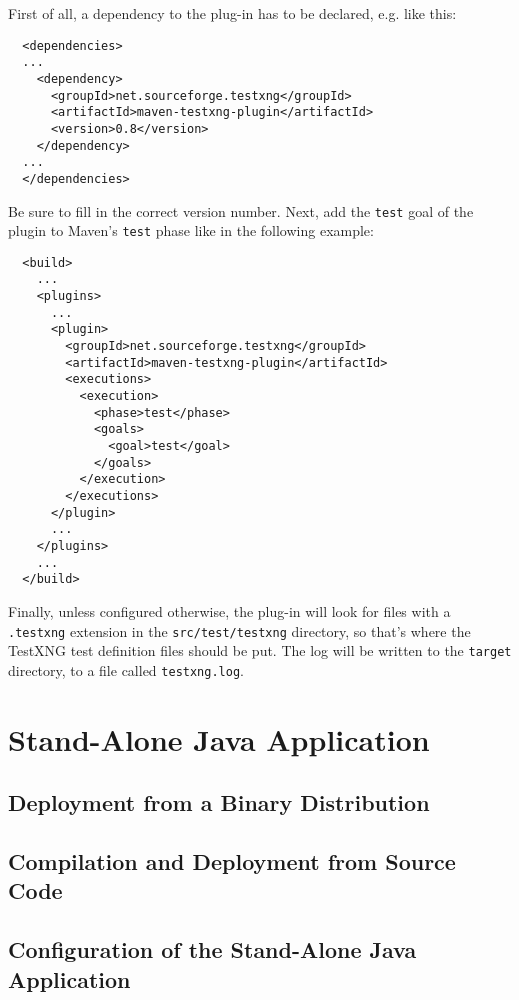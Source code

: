 First of all, a dependency to the plug-in has to be declared, e.g. like this:
\begin{verbatim}
  <dependencies>
  ...
    <dependency>
      <groupId>net.sourceforge.testxng</groupId>
      <artifactId>maven-testxng-plugin</artifactId>
      <version>0.8</version>
    </dependency>
  ...
  </dependencies>
\end{verbatim}
Be sure to fill in the correct version number. Next, add the {\tt test} goal of the plugin to Maven's {\tt test} phase like in the following example:
\begin{verbatim}
  <build>
    ...
    <plugins>
      ...
      <plugin>
        <groupId>net.sourceforge.testxng</groupId>
        <artifactId>maven-testxng-plugin</artifactId>
        <executions>
          <execution>
            <phase>test</phase>
            <goals>
              <goal>test</goal>
            </goals>
          </execution>
        </executions>
      </plugin>
      ...
    </plugins>
    ...
  </build>
\end{verbatim}
Finally, unless configured otherwise, the plug-in will look for files with a {\tt .testxng} extension in the {\tt src/test/testxng} directory, so that's where the TestXNG test definition files should be put. The log will be written to the {\tt target} directory, to a file called {\tt testxng.log}.

\section{Stand-Alone Java Application}

\subsection{Deployment from a Binary Distribution}

\subsection{Compilation and Deployment from Source Code}

\subsection{Configuration of the Stand-Alone Java Application}
